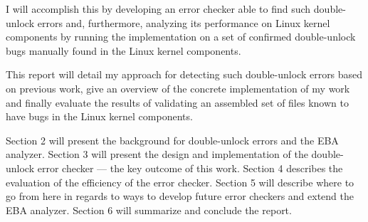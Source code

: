 \newpar I will accomplish this by developing an error checker able to find such double-unlock errors and, furthermore, analyzing its performance on Linux kernel components by running the implementation on a set of confirmed double-unlock bugs manually found in the Linux kernel components.

\newpar This report will detail my approach for detecting such double-unlock errors based on previous work, give an overview of the concrete implementation of my work and finally evaluate the results of validating an assembled set of files known to have bugs in the Linux kernel components.

\newpar Section 2 will present the background for double-unlock errors and the EBA analyzer. Section 3 will present the design and implementation of the double-unlock error checker --- the key outcome of this work. Section 4 describes the evaluation of the efficiency of the error checker. Section 5 will describe where to go from here in regards to ways to develop future error checkers and extend the EBA analyzer. Section 6 will summarize and conclude the report.